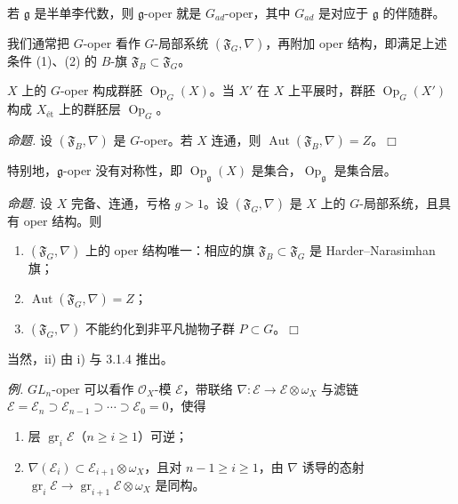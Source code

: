 若 $\mathfrak{g}$ 是半单李代数，则 $\mathfrak{g}$-oper 就是 $G_{ad}$-oper，其中 $G_{ad}$ 是对应于 $\mathfrak{g}$ 的伴随群。

我们通常把 $G$-oper 看作 $G$-局部系统 $(\mathfrak{F}_G,\nabla)$，再附加 oper 结构，即满足上述条件 (1)、(2) 的 $B$-旗 $\mathfrak{F}_B \subset \mathfrak{F}_G$。


$X$ 上的 $G$-oper 构成群胚 $\operatorname{Op}_G(X)$。当 $X'$ 在 $X$ 上平展时，群胚 $\operatorname{Op}_G(X')$ 构成 $X_{\text{\'et}}$ 上的群胚层 $\operatorname{Op}_G$。

 \emph{命题.} 设 $(\mathfrak{F}_B,\nabla)$ 是 $G$-oper。若 $X$ 连通，则 $\operatorname{Aut}(\mathfrak{F}_B,\nabla) = Z$。\hfill$\Box$

特别地，$\mathfrak{g}$-oper 没有对称性，即 $\operatorname{Op}_{\mathfrak{g}}(X)$ 是集合，$\operatorname{Op}_{\mathfrak{g}}$ 是集合层。

 \emph{命题.} 设 $X$ 完备、连通，亏格 $g > 1$。设 $(\mathfrak{F}_G,\nabla)$ 是 $X$ 上的 $G$-局部系统，且具有 oper 结构。则

\begin{enumerate}[label=(\roman*),leftmargin=2.2em]
\item $(\mathfrak{F}_G,\nabla)$ 上的 oper 结构唯一：相应的旗 $\mathfrak{F}_B \subset \mathfrak{F}_G$ 是 Harder--Narasimhan 旗；
\item $\operatorname{Aut}(\mathfrak{F}_G,\nabla) = Z$；
\item $(\mathfrak{F}_G,\nabla)$ 不能约化到非平凡抛物子群 $P \subset G$。\hfill$\Box$
\end{enumerate}

当然，ii) 由 i) 与 3.1.4 推出。

 \emph{例.} $GL_n$-oper 可以看作 $\mathcal{O}_X$-模 $\mathcal{E}$，带联络 $\nabla: \mathcal{E} \to \mathcal{E}\otimes\omega_X$ 与滤链 $\mathcal{E} = \mathcal{E}_n \supset \mathcal{E}_{n-1} \supset \cdots \supset \mathcal{E}_0 = 0$，使得

\begin{enumerate}[label=(\roman*),leftmargin=2.2em]
\item 层 $\operatorname{gr}_i\mathcal{E}$（$n \ge i \ge 1$）可逆；
\item $\nabla(\mathcal{E}_i) \subset \mathcal{E}_{i+1}\otimes\omega_X$，且对 $n-1 \ge i \ge 1$，由 $\nabla$ 诱导的态射 $\operatorname{gr}_i\mathcal{E} \to \operatorname{gr}_{i+1}\mathcal{E}\otimes\omega_X$ 是同构。
\end{enumerate}

